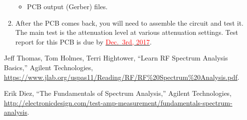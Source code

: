 \documentclass[letterpaper, 11pt]{article}
\newcommand{\due}[1]{\href{https://github.com/ucdart/UCD-EEC134/blob/master/support/schedule/eec134-schedule.pdf}{\textcolor{red}{#1}}}
\begin{document}
\begin{enumerate}
\begin{itemize}
			\item PCB output (Gerber) files.
		\end{itemize}

	\item After the PCB comes back, you will need to assemble the circuit and test it. The main test is the attenuation level at various attenuation settings. Test report for this PCB is due by \due{Dec.~3rd, 2017}.

\end{enumerate}

\begin{thebibliography}{9}
 
Jeff Thomas, Tom Holmes, Terri Hightower, ``Learn RF Spectrum Analysis Basics,'' Agilent Technologies, \url{https://www.jlab.org/uspas11/Reading/RF/RF%20Spectrum%20Analysis.pdf}.

Erik Diez, ``The Fundamentals of Spectrum Analysis,'' Agilent Technologies, \url{http://electronicdesign.com/test-amp-measurement/fundamentals-spectrum-analysis}.


\end{thebibliography}
\end{document}
